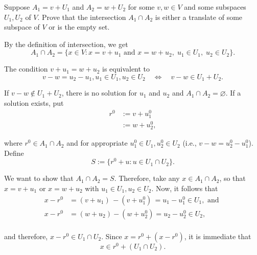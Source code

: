 \begin{xrcs}
  Suppose $A_1 = v + U_1$ and $A_2 = w + U_2$ for some $v, w \in V$ and some subspaces $U_1, U_2$ of $V$. Prove that the intersection $A_1 \cap A_2$ is either a translate of some subspace of $V$ or is the empty set.
  \begin{xprf}
    By the definition of intersection, we get
    \begin{equation}
      A_1 \cap A_2 = \{ x \in V : x = v + u_1 \text{ and } x = w + u_2, \; u_1 \in U_1, \; u_2 \in U_2 \}.
    \end{equation}

    The condition $v + u_1 = w + u_2$ is equivalent to
    \begin{equation}
      v-w = u_2 - u_1, u_1 \in U_1, u_2 \in U_2 \quad \Longleftrightarrow \quad v-w \in U_1 + U_2.
    \end{equation}

    If $v-w \notin U_1 + U_2$, there is no solution for $u_1$ and $u_2$ and $A_1 \cap A_2 = \varnothing$. If a solution exists, put
    \begin{equation}
      \begin{aligned}
        r^0 &:= v + u_1^0  \\
            &:= w + u_2^0,
      \end{aligned}
    \end{equation}

    where $r^0 \in A_1 \cap A_2$ and for appropriate $u_1^0 \in U_1, u_2^0 \in U_2$ (i.e., $v-w = u_2^0 - u_1^0$).
    Define
    \begin{equation}
      S := \{ r^0 + u : u \in U_1 \cap U_2 \}.
    \end{equation}

    We want to show that $A_1 \cap A_2 = S$. Therefore, take any $x \in A_1 \cap A_2$, so that $x = v + u_1$ or $x = w + u_2$ with $u_1 \in U_1, u_2 \in U_2$. Now, it follows that
    \begin{equation}
      \begin{aligned}
        x-r^0 &= (v + u_1) \,- (v + u_1^0) \, = u_1 - u_1^0 \in U_1,  \text{ and } \\
        x-r^0 &= (w + u_2)   - (w + u_2^0)    = u_2 - u_2^0 \in U_2, \\
      \end{aligned}
    \end{equation}

    and therefore, $x-r^0 \in U_1 \cap U_2$. Since $x = r^0 + (x-r^0)$, it is immediate that
    \begin{equation}
      x \in r^0 + (U_1 \cap U_2).
    \end{equation}


\end{xprf}
\end{xrcs}
